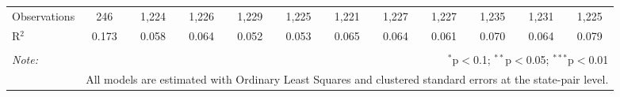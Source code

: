 \begin{table}[!htbp]
\begin{tabular}{@{\extracolsep{5pt}}lccccccccccc}
Observations & 246 & 1,224 & 1,226 & 1,229 & 1,225 & 1,221 & 1,227 & 1,227 & 1,235 & 1,231 & 1,225 \\ 
R$^{2}$ & 0.173 & 0.058 & 0.064 & 0.052 & 0.053 & 0.065 & 0.064 & 0.061 & 0.070 & 0.064 & 0.079 \\ 
\hline 
\hline \\[-1.8ex] 
\textit{Note:}  & \multicolumn{11}{r}{$^{*}$p$<$0.1; $^{**}$p$<$0.05; $^{***}$p$<$0.01} \\ 
 & \multicolumn{11}{r}{All models are estimated with Ordinary Least Squares and clustered standard errors at the state-pair level.} \\ 
\end{tabular} 
\end{table} 
